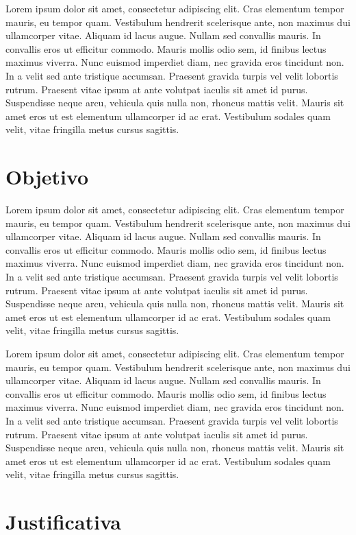 \documentclass[conference]{IEEEtran}
\begin{document}
Lorem ipsum dolor sit amet, consectetur adipiscing elit. Cras elementum tempor mauris, eu tempor quam. Vestibulum hendrerit scelerisque ante, non maximus dui ullamcorper vitae. Aliquam id lacus augue. Nullam sed convallis mauris. In convallis eros ut efficitur commodo. Mauris mollis odio sem, id finibus lectus maximus viverra. Nunc euismod imperdiet diam, nec gravida eros tincidunt non. In a velit sed ante tristique accumsan. Praesent gravida turpis vel velit lobortis rutrum. Praesent vitae ipsum at ante volutpat iaculis sit amet id purus. Suspendisse neque arcu, vehicula quis nulla non, rhoncus mattis velit. Mauris sit amet eros ut est elementum ullamcorper id ac erat. Vestibulum sodales quam velit, vitae fringilla metus cursus sagittis.

\section{Objetivo}

Lorem ipsum dolor sit amet, consectetur adipiscing elit. Cras elementum tempor mauris, eu tempor quam. Vestibulum hendrerit scelerisque ante, non maximus dui ullamcorper vitae. Aliquam id lacus augue. Nullam sed convallis mauris. In convallis eros ut efficitur commodo. Mauris mollis odio sem, id finibus lectus maximus viverra. Nunc euismod imperdiet diam, nec gravida eros tincidunt non. In a velit sed ante tristique accumsan. Praesent gravida turpis vel velit lobortis rutrum. Praesent vitae ipsum at ante volutpat iaculis sit amet id purus. Suspendisse neque arcu, vehicula quis nulla non, rhoncus mattis velit. Mauris sit amet eros ut est elementum ullamcorper id ac erat. Vestibulum sodales quam velit, vitae fringilla metus cursus sagittis.

Lorem ipsum dolor sit amet, consectetur adipiscing elit. Cras elementum tempor mauris, eu tempor quam. Vestibulum hendrerit scelerisque ante, non maximus dui ullamcorper vitae. Aliquam id lacus augue. Nullam sed convallis mauris. In convallis eros ut efficitur commodo. Mauris mollis odio sem, id finibus lectus maximus viverra. Nunc euismod imperdiet diam, nec gravida eros tincidunt non. In a velit sed ante tristique accumsan. Praesent gravida turpis vel velit lobortis rutrum. Praesent vitae ipsum at ante volutpat iaculis sit amet id purus. Suspendisse neque arcu, vehicula quis nulla non, rhoncus mattis velit. Mauris sit amet eros ut est elementum ullamcorper id ac erat. Vestibulum sodales quam velit, vitae fringilla metus cursus sagittis.

\section{Justificativa}
\end{document}
